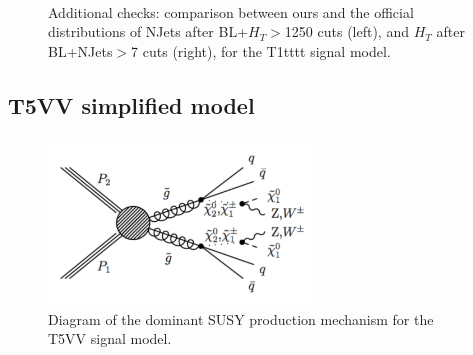         \begin{figure}
        \centering
        \hspace{-1 cm}
        ~ %
        \caption{Additional checks: comparison between ours and the official distributions of NJets after BL+$H_T$$>$1250 cuts (left), and $H_T$ after BL+NJets$>$7 cuts (right), for the T1tttt signal model.}
        \end{figure}  
        

\clearpage
\subsection{T5VV simplified model}

\begin{figure}[h!]
\centering
\includegraphics[width=7cm]{figures/Appendices/Ma5ValidationSUS13012/T5VV.pdf}
\caption{Diagram of the dominant SUSY production mechanism
for the T5VV signal model.}
\label{fig:T5VV}
\end{figure}

